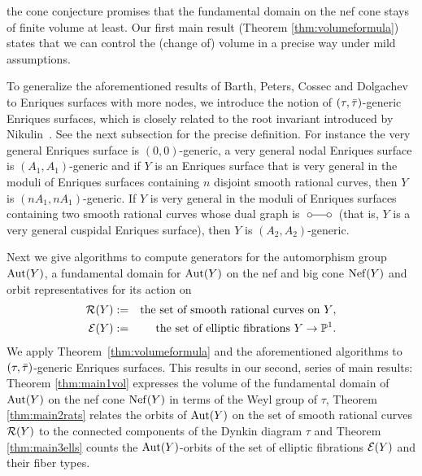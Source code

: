 \documentclass{amsart}
\numberwithin{procedure}{section}
\begin{document}
 the cone conjecture promises that the fundamental domain on the nef cone stays of finite volume at least. 
 Our first main result (Theorem \ref{thm:volumeformula}) states that we can control the (change of) volume in a precise way under mild assumptions.
\par
To generalize the aforementioned results of
Barth, Peters, Cossec and Dolgachev to Enriques surfaces with more nodes, we introduce the notion of $(\tau,\bar{\tau})$-generic Enriques surfaces, which is closely related to the root invariant
introduced by  Nikulin~\cite{Nikulin1984}.
See the next subsection for the precise definition.
For instance the very general Enriques surface is $(0,0)$-generic,
a very general nodal Enriques surface is $(A_1,A_1)$-generic and
if $Y$ is an Enriques surface that is very general in the moduli
of Enriques surfaces containing $n$ disjoint smooth rational curves,
then $Y$ is  $(nA_1, nA_1)$-generic. 
%
\newcommand{\Atwo}{\setlength\unitlength{.2truecm}%
\begin{picture}(4.7,1.7)(0,0)%
\put(.9,.5){\circle{.7}}%
\put(3.9,.5){\circle{.7}}%
\put(1.25,.5){\line(1,0){2.3}}%
\end{picture}}%
%
If $Y$ is very general in the moduli
of Enriques surfaces containing
two smooth rational curves whose dual graph is $\Atwo$
(that is, $Y$ is a very general cuspidal Enriques surface),
then $Y$ is  $(A_2, A_2)$-generic.
%
\par
Next we give algorithms to compute generators for the automorphism group $\operatorname{\mathrm{Aut}}\nolimits(Y)$, 
a fundamental domain for $\operatorname{\mathrm{Aut}}\nolimits(Y)$ on the nef and big cone $\mathord{\rm Nef}(Y)$ and orbit representatives for its action on
%
\begin{eqnarray*}
\mathord{\mathcal R}(Y) &:=& \textrm{the set of  smooth rational curves on $Y$}, \\
\mathord{\mathcal E}(Y) &:=& \textrm{the set of elliptic
fibrations $Y\to \mathord{\mathbb P}^1$}.
\end{eqnarray*}
%
We apply Theorem~\ref{thm:volumeformula} and the aforementioned algorithms
to $(\tau, \bar{\tau})$-generic Enriques surfaces. 
This results in our second, series of main results: 
Theorem \ref{thm:main1vol} expresses the volume of the fundamental domain of
 $\operatorname{\mathrm{Aut}}\nolimits(Y)$ on the nef cone $\mathord{\rm Nef}(Y)$ in terms of the Weyl group of $\tau$, 
Theorem \ref{thm:main2rats} relates the orbits of $\operatorname{\mathrm{Aut}}\nolimits(Y)$
on the set of smooth rational curves $\mathord{\mathcal R}(Y)$ 
to the connected components of the Dynkin diagram $\tau$ and 
Theorem \ref{thm:main3ells} counts the $\operatorname{\mathrm{Aut}}\nolimits(Y)$-orbits of the set of elliptic fibrations $\mathord{\mathcal E}(Y)$ and their fiber types.
\end{document}

